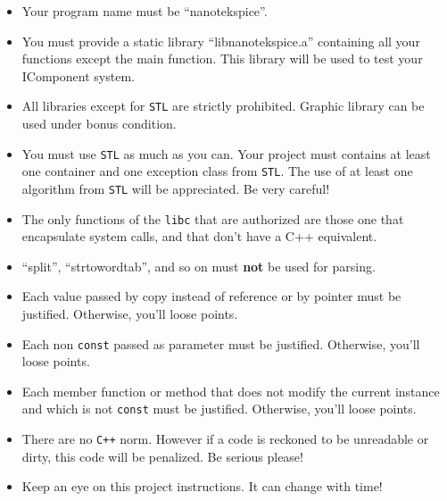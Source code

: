 \documentclass{koala-en}
\begin{document}
  \begin{itemize}

    \item Your program name must be ``nanotekspice''.

    \item You must provide a static library ``libnanotekspice.a'' containing
      all your functions except the main function. This library will be used
      to test your IComponent system.
    
    \item All libraries except for \texttt{STL} are strictly
	prohibited. Graphic library can be used under bonus condition.

    \item You must use \texttt{STL} as much as you can. Your project must
      contains at least one container and one exception class from \texttt{STL}. 
     The use of at least one algorithm from \texttt{STL} will be appreciated. 
     Be very careful!

    \item The only functions of the \texttt{libc} that are authorized are those one
      that encapsulate system calls, and that don't have a C++ equivalent.

    \item ``split'', ``strtowordtab'', and so on must \textbf{not} be
      used for parsing.

    \item Each value passed by copy instead of reference or by
          pointer must be justified. Otherwise, you'll loose points.

    \item Each non \texttt{const} passed as parameter must be
      justified. Otherwise, you'll loose points.

    \item Each member function or method that does not modify the current
      instance and which is not \texttt{const} must be justified. Otherwise, 
      you'll loose points.

    \item There are no \texttt{C++} norm. However if a code is reckoned
      to be unreadable or dirty, this code will be penalized. Be
      serious please!

    \item Keep an eye on this project instructions. It can change with time!

  \end{itemize}
\end{document}
